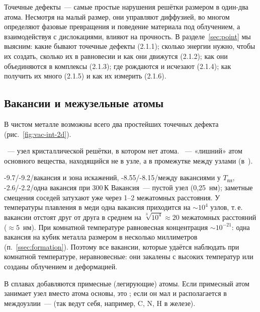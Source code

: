 \begin{orientir}
Точечные дефекты~— самые простые нарушения решётки размером в один-два
атома. Несмотря на малый размер, они управляют диффузией, во многом
определяют фазовые превращения и поведение материала под облучением, а
взаимодействуя с дислокациями, влияют на прочность. В разделе~\ref{sec:point}
мы выясним: какие бывают точечные дефекты (2.1.1); сколько энергии нужно,
чтобы их создать, сколько их в равновесии и как они движутся (2.1.2);
как они объединяются в комплексы (2.1.3); где рождаются и исчезают (2.1.4);
как получить их много (2.1.5) и как их измерить (2.1.6).
\end{orientir}

\subsection{Вакансии и межузельные атомы}\label{ssec:vac-int}

В чистом металле возможны всего два простейших точечных дефекта
(рис.~\ref{fig:vac-int-2d}).

\begin{opredelenie}
~— узел кристаллической решётки, в котором нет атома.
~— «лишний» атом основного вещества, находящийся
не в узле, а в промежутке между узлами (в~).
\end{opredelenie}

\begin{masshtab}{-9.7/-9.2/{вакансия и зона искажений}, -8.55/-8.15/{между вакансиями у $T_\text{пл}$}, -2.6/-2.2/{одна вакансия при 300\,К}}
Вакансия~— пустой узел (0,25~нм); заметные смещения соседей затухают
уже через 1--2 межатомных расстояния. У температуры плавления в меди
одна вакансия приходится на $\sim10^4$ узлов, т.\,е. вакансии отстоят друг
от друга в среднем на $\sqrt[3]{10^4}\approx20$ межатомных расстояний
($\approx5$~нм). При комнатной температуре равновесная концентрация
$\sim10^{-21}$: одна вакансия на кубик металла размером в несколько
миллиметров (п.~\ref{ssec:formation}). Поэтому все вакансии, которые
удаётся наблюдать при комнатной температуре, неравновесные: они
закалены с высоких температур или созданы облучением и деформацией.
\end{masshtab}

В сплавах добавляются примесные (легирующие) атомы. Если примесный
атом занимает узел вместо атома основы, это ; если
он мал и располагается в междоузлии~—  (так ведут
себя, например, C, N, H в железе).

